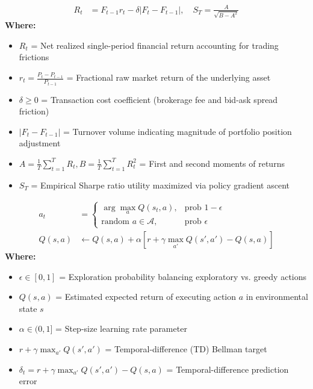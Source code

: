 \begin{formulabox}
\begin{align*}
    R_t &= F_{t-1} r_t - \delta |F_t - F_{t-1}|, \quad S_T = \frac{A}{\sqrt{B - A^2}}
\end{align*}
\textbf{Where:}
\begin{itemize}[noitemsep, topsep=1pt]
    \item $R_t$ = Net realized single-period financial return accounting for trading frictions
    \item $r_t = \frac{P_t - P_{t-1}}{P_{t-1}}$ = Fractional raw market return of the underlying asset
    \item $\delta \ge 0$ = Transaction cost coefficient (brokerage fee and bid-ask spread friction)
    \item $|F_t - F_{t-1}|$ = Turnover volume indicating magnitude of portfolio position adjustment
    \item $A = \frac{1}{T}\sum_{t=1}^T R_t, B = \frac{1}{T}\sum_{t=1}^T R_t^2$ = First and second moments of returns
    \item $S_T$ = Empirical Sharpe ratio utility maximized via policy gradient ascent
\end{itemize}
\end{formulabox}

\begin{formulabox}
\begin{align*}
    a_t &= \begin{cases}
    \arg\max_{a} Q(s_t, a), & \text{prob } 1 - \epsilon \\[2pt]
    \text{random } a \in \mathcal{A}, & \text{prob } \epsilon
    \end{cases} \\[4pt]
    Q(s, a) &\leftarrow Q(s, a) + \alpha \left[ r + \gamma \max_{a'} Q(s', a') - Q(s, a) \right]
\end{align*}
\textbf{Where:}
\begin{itemize}[noitemsep, topsep=1pt]
    \item $\epsilon \in [0, 1]$ = Exploration probability balancing exploratory vs. greedy actions
    \item $Q(s, a)$ = Estimated expected return of executing action $a$ in environmental state $s$
    \item $\alpha \in (0, 1]$ = Step-size learning rate parameter
    \item $r + \gamma \max_{a'} Q(s', a')$ = Temporal-difference (TD) Bellman target
    \item $\delta_t = r + \gamma \max_{a'} Q(s', a') - Q(s, a)$ = Temporal-difference prediction error
\end{itemize}
\end{formulabox}

